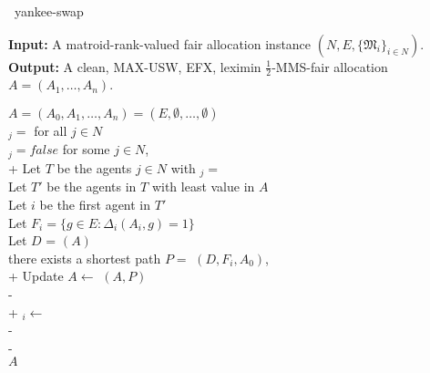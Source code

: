 \begin{algorithm}{~\cite{viswanathan2023yankee}}{yankee-swap}

\textbf{Input:}  \tab A matroid-rank-valued fair allocation instance $(N, E, \{\mathfrak{M}_i\}_{i\in N})$. \\
\textbf{Output:} \tab A clean, MAX-USW, EFX, leximin $\frac{1}{2}$-MMS-fair allocation\\
\mbox{}\tab$A = (A_1,\dots,A_n)$.

\begin{pseudo}[label=\small\arabic*, indent-mark]
    $A = (A_0, A_1, \dots, A_n) = (E, \emptyset, \dots, \emptyset)$ \\
    $_j =$  for all $j\in N$ \\
     $_j = false$ for some $j\in N$,   \\+
        Let $T$ be the agents $j\in N$ with $_j =$  \\
        Let $T'$ be the agents in $T$ with least value in $A$ \\
        Let $i$ be the first agent in $T'$  \\
        Let $F_i = \{ g\in E : \Delta_i(A_i, g) = 1 \}$ \\
        Let $D$ = $(A)$ \\
         there exists a shortest path $P =$ $(D, F_i, A_0)$,  \\+
            Update $A \leftarrow$ $(A, P)$ \\-
         \\+
            $_i \leftarrow$  \\-
         \\-
     \\
     $A$
\end{pseudo}
    
\end{algorithm}

